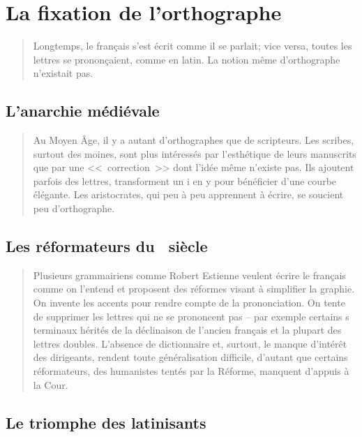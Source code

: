 \section{La fixation de l'orthographe}\label{sec:orthofix}

\begin{quote}
  Longtemps, le français s'est écrit comme il se parlait; vice versa,
  toutes les lettres se prononçaient, comme en latin. La notion même
  d'orthographe n'existait pas.
\end{quote}

\subsection{L'anarchie médiévale}\label{subsec:arnar}

\begin{quotation}
  Au Moyen Âge, il y a autant d'orthographes que de scripteurs. Les
  scribes, surtout des moines, sont plus intéressés par l'esthétique
  de leurs manuscrits que par une <<~correction~>> dont l'idée même
  n'existe pas. Ils ajoutent parfois des lettres, transforment un i en
  y pour bénéficier d'une courbe élégante.
  Les aristocrates, qui peu à peu apprennent à écrire, se soucient peu
  d'orthographe. 
\end{quotation}

\subsection{Les réformateurs du \textsc{}~siècle}\label{subsec:ref}
\begin{quotation}
  Plusieurs grammairiens comme Robert Estienne veulent écrire le
  français comme on l'entend et proposent des réformes visant à
  simplifier la graphie.
  On invente les accents pour rendre compte de la prononciation. On
  tente de supprimer les lettres qui ne se prononcent pas -- par
  exemple certains s terminaux hérités de la déclinaison de l'ancien
  français et la plupart des lettres doubles.
  L'absence de dictionnaire et, surtout, le manque d'intérêt des
  dirigeants, rendent toute généralisation difficile, d'autant que
  certains réformateurs, des humanistes tentés par la Réforme,
  manquent d'appuis à la Cour.
\end{quotation}

\subsection{Le triomphe des latinisants}\label{subsec:trilat}

